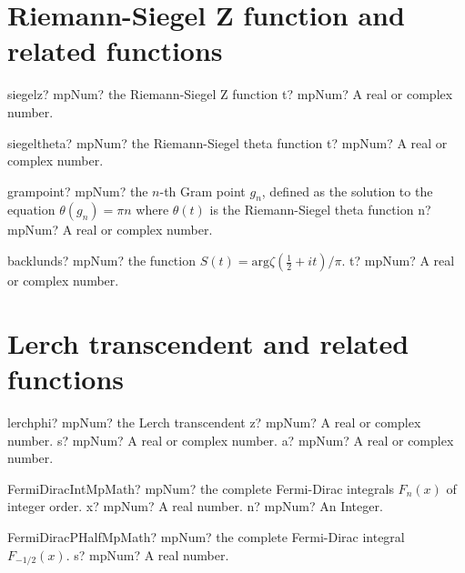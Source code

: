 \documentclass[12pt,a4paper,openany]{book}
\begin{document}
\section{Riemann-Siegel Z function and related functions}

\begin{mpFunctionsExtract}
\mpFunctionOne
{siegelz? mpNum? the Riemann-Siegel Z function}
{t? mpNum? A real or complex number.}
\end{mpFunctionsExtract}

\begin{mpFunctionsExtract}
\mpFunctionOne
{siegeltheta? mpNum? the Riemann-Siegel theta function}
{t? mpNum? A real or complex number.}
\end{mpFunctionsExtract}

\begin{mpFunctionsExtract}
\mpFunctionOne
{grampoint? mpNum? the $n$-th Gram point $g_n$, defined as the solution to the equation $\theta(g_n)=\pi n$ where $\theta(t)$ is the Riemann-Siegel theta function}
{n? mpNum? A real or complex number.}
\end{mpFunctionsExtract}

\begin{mpFunctionsExtract}
\mpFunctionOne
{backlunds? mpNum? the function $S(t) = \text{arg}\zeta\left(\tfrac{1}{2}+it\right)/\pi$.}
{t? mpNum? A real or complex number.}
\end{mpFunctionsExtract}

\section{Lerch transcendent and related functions}

\begin{mpFunctionsExtract}
\mpFunctionThree
{lerchphi? mpNum? the Lerch transcendent}
{z? mpNum? A real or complex number.}
{s? mpNum? A real or complex number.}
{a? mpNum? A real or complex number.}
\end{mpFunctionsExtract}

\begin{mpFunctionsExtract}
\mpFunctionTwoNotImplemented
{FermiDiracIntMpMath? mpNum? the complete Fermi-Dirac integrals $F_n(x)$ of integer order.}
{x? mpNum? A real number.}
{n? mpNum? An Integer.}
\end{mpFunctionsExtract}

\begin{mpFunctionsExtract}
\mpFunctionOneNotImplemented
{FermiDiracPHalfMpMath? mpNum? the complete Fermi-Dirac integral $F_{-1/2}(x)$.}
{s? mpNum? A real number.}
\end{mpFunctionsExtract}
\end{document}
